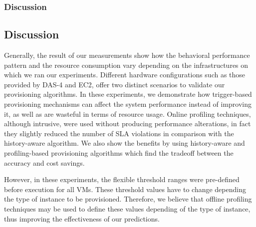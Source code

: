 \subsubsection{Discussion}


\subsection{Discussion}



Generally, the result of our measurements show how the behavioral performance pattern and the resource consumption vary depending on the infrastructures on which we ran our experiments. Different hardware configurations such as those provided by DAS-4 and EC2, offer two distinct scenarios to validate our provisioning algorithms.  In these experiments, we demonstrate how trigger-based provisioning mechanisms can affect the system performance instead of improving it, as well as are wasteful in terms of resource usage. Online profiling techniques, although intrusive, were used without producing performance alterations, in fact they slightly reduced the number of SLA violations in comparison with the history-aware algorithm. We also show the benefits by using history-aware and profiling-based provisioning algorithms which find the tradeoff between the accuracy and cost savings. 

However, in these experiments, the flexible threshold ranges were pre-defined before execution for all VMs. These threshold values have to change depending the type of instance to be provisioned. Therefore, we believe that offline profiling techniques may be used to define these values depending of the type of instance, thus improving the effectiveness of our predictions.





